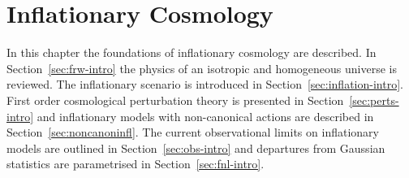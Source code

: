 \renewcommand{\CVSrevision}{\version$Id: mainintro.tex,v 1.68 2009/12/07 15:38:40 ith Exp $}

\chapter{Inflationary Cosmology}
\label{ch:introduction}

In this chapter the foundations of inflationary cosmology are described. 
% 
In Section~\ref{sec:frw-intro} the
physics of
an isotropic and homogeneous universe is reviewed. The inflationary
scenario is introduced in Section~\ref{sec:inflation-intro}. 
First order cosmological perturbation theory is presented in
Section~\ref{sec:perts-intro} and inflationary models with non-canonical actions are
described in Section~\ref{sec:noncanoninfl}.
The current observational limits on inflationary models are outlined in
Section~\ref{sec:obs-intro} and departures from
Gaussian statistics are parametrised in Section~\ref{sec:fnl-intro}.



